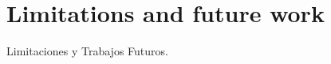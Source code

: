 \section{Limitations and future work}
\label{sec:limitations_future_work}
Limitaciones y Trabajos Futuros.
